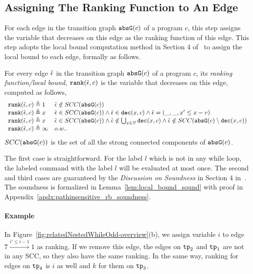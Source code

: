   \subsection{Assigning The Ranking Function to An Edge}
  For each edge in the transition graph $\mathtt{abs}{\mathtt{G}}(c)$ of a program $c$,
  this step assigns the variable that decreases on this edge as the ranking function of this edge.
  This step adopts the local bound computation method in Section 4 of~\cite{SinnZV17} to assign the local bound to each edge,
  formally as follows.
  \begin{defn}
  \label{def:ranking_gen}
  For every edge $\hat{\mathtt{\epsilon}{}}$ in the transition graph $\mathtt{abs}{\mathtt{G}}(c)$ of a program $c$,
  its \emph{ranking function/local bound}, $\mathtt{rank}(\hat{\mathtt{\epsilon}{}}, c)$
  is the variable that decreases on this edge, computed as follows,
  \[ 
  \begin{array}{ll}
    \mathtt{rank}(\hat{\mathtt{\epsilon}{}}, c) \triangleq 1 
    & \hat{\mathtt{\epsilon}{}} \notin SCC(\mathtt{abs}{\mathtt{G}}(c))
    \\
    \mathtt{rank}(\hat{\mathtt{\epsilon}{}}, c) \triangleq x
    & \hat{\mathtt{\epsilon}{}} \in SCC(\mathtt{abs}{\mathtt{G}}(c)) \land \hat{\mathtt{\epsilon}{}} \in \mathtt{dec}(x, c) \land  \hat{\mathtt{\epsilon}{}} = (\_, \_ , x' \leq x - v) \\
    \mathtt{rank}(\hat{\mathtt{\epsilon}{}}, c) \triangleq x
    & \hat{\mathtt{\epsilon}{}} \in SCC(\mathtt{abs}{\mathtt{G}}(c)) \land 
    \hat{\mathtt{\epsilon}{}}  \notin \bigcup_{x \in \mathcal{V}} \mathtt{dec}(x, c)
    \land \hat{\mathtt{\epsilon}{}} \notin SCC(\mathtt{abs}{\mathtt{G}}(c) \setminus \mathtt{dec}(x, c))\\
    \mathtt{rank}(\hat{\mathtt{\epsilon}{}}, c) \triangleq \infty
    & o.w..
  \end{array}
  \]
  $SCC(\mathtt{abs}{\mathtt{G}}(c))$ is the set of all the strong connected components of $\mathtt{abs}{\mathtt{G}}(c)$.
  \end{defn}
    The first case is straightforward. 
    For the label $l$ which is not in any while loop, 
    the labeled command with the label $l$ will be 
    evaluated at most once. 
    The second and third cases are guaranteed by the \emph{Discussion on Soundness} in Section 4 in~\cite{SinnZV17}.
    The soundness is formalized in Lemma~\ref{lem:local_bound_sound} with proof in Appendix~\ref{apdx:pathinsensitive_rb_soundness}.
  \paragraph{Example}
  In Figure~\ref{fig:relatedNestedWhileOdd-overview}(b), we assign variable $i$ to edge $7 \xrightarrow{i' \leq i - 1} 1$ as ranking.
  If we remove this edge, the edges on $\mathtt{tp}_2$ and $\mathtt{tp}_1$ are not in any SCC, so they also have the same ranking.
In the same way, ranking for edges on $\mathtt{tp}_4$ is $i$ as well and $k$ for them on $\mathtt{tp}_3$.


